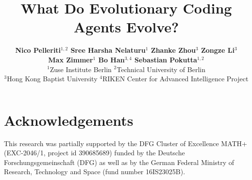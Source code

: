 \documentclass{article}
\title{What Do Evolutionary Coding Agents Evolve?}
\author{%
  \textbf{Nico Pelleriti$^{1,2}$ \quad Sree Harsha Nelaturu$^{1}$ \quad Zhanke Zhou$^{3}$ \quad Zongze Li$^{3}$} \\[0.2em]
  \textbf{Max Zimmer$^{1}$ \quad Bo Han$^{3,4}$ \quad Sebastian Pokutta$^{1,2}$} \\[0.4em]
  \normalfont $^{1}$Zuse Institute Berlin \quad $^{2}$Technical University of Berlin \\
  \normalfont $^{3}$Hong Kong Baptist University \quad $^{4}$RIKEN Center for Advanced Intelligence Project
}
\begin{document}
\maketitle









\section*{Acknowledgements}
This research was partially supported by the DFG Cluster of Excellence MATH+ (EXC-2046/1, project id 390685689) funded by the Deutsche Forschungsgemeinschaft (DFG) as well as by the German Federal Ministry of Research, Technology and Space (fund number 16IS23025B).

\newpage




\newpage

\end{document}
